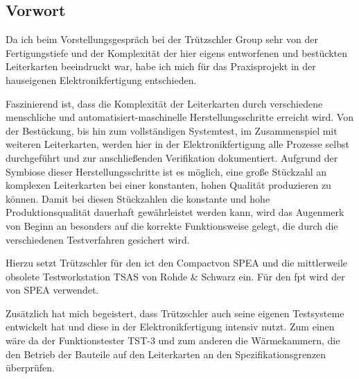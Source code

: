 \subsection{Vorwort}
    Da ich beim Vorstellungsgespräch bei der Trützschler Group sehr von der Fertigungstiefe und der Komplexität der hier eigens entworfenen und bestückten Leiterkarten beeindruckt war, habe ich mich für das Praxisprojekt in der hauseigenen Elektronikfertigung entschieden.
    
    Faszinierend ist, dass die Komplexität der Leiterkarten durch verschiedene menschliche und automatisiert-maschinelle Herstellungsschritte erreicht wird.
    Von der Bestückung, bis hin zum vollständigen Systemtest, im Zusammenspiel mit weiteren Leiterkarten, werden hier in der Elektronikfertigung alle Prozesse selbst durchgeführt und zur anschließenden Verifikation dokumentiert.
    Aufgrund der Symbiose dieser Herstellungsschritte ist es möglich, eine große Stückzahl an komplexen Leiterkarten bei einer konstanten, hohen Qualität produzieren zu können.
    Damit bei diesen Stückzahlen die konstante und hohe Produktionsqualität dauerhaft gewährleistet werden kann, wird das Augenmerk von Beginn an besonders auf die korrekte Funktionsweise gelegt, die durch die verschiedenen Testverfahren gesichert wird.
    
    Hierzu setzt Trützschler für den \ac{ict} den  Compact\grqq\@ von SPEA und die mittlerweile obsolete Testworkstation TSAS von Rohde \& Schwarz ein.
    Für den \ac{fpt} wird der \grqq\@ von SPEA verwendet.

    Zusätzlich hat mich begeistert, dass Trützschler auch seine eigenen Testsysteme entwickelt hat und diese in der Elektronikfertigung intensiv nutzt.
    Zum einen wäre da der Funktionstester TST-3 und zum anderen die Wärmekammern, die den Betrieb der Bauteile auf den Leiterkarten an den Spezifikationsgrenzen überprüfen.